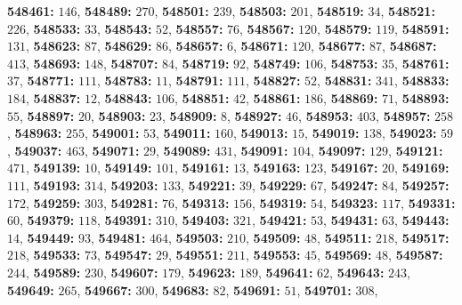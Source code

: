 \textsf{\bfseries 548461:} $146$, \textsf{\bfseries 548489:} $270$, \textsf{\bfseries 548501:} $239$, \textsf{\bfseries 548503:} $201$, \textsf{\bfseries 548519:} $34$, \textsf{\bfseries 548521:} $226$, \textsf{\bfseries 548533:} $33$, \textsf{\bfseries 548543:} $52$, \textsf{\bfseries 548557:} $76$, \textsf{\bfseries 548567:} $120$, \textsf{\bfseries 548579:} $119$, \textsf{\bfseries 548591:} $131$, \textsf{\bfseries 548623:} $87$, \textsf{\bfseries 548629:} $86$, \textsf{\bfseries 548657:} $6$, \textsf{\bfseries 548671:} $120$, \textsf{\bfseries 548677:} $87$, \textsf{\bfseries 548687:} $413$, \textsf{\bfseries 548693:} $148$, \textsf{\bfseries 548707:} $84$, \textsf{\bfseries 548719:} $92$, \textsf{\bfseries 548749:} $106$, \textsf{\bfseries 548753:} $35$, \textsf{\bfseries 548761:} $37$, \textsf{\bfseries 548771:} $111$, \textsf{\bfseries 548783:} $11$, \textsf{\bfseries 548791:} $111$, \textsf{\bfseries 548827:} $52$, \textsf{\bfseries 548831:} $341$, \textsf{\bfseries 548833:} $184$, \textsf{\bfseries 548837:} $12$, \textsf{\bfseries 548843:} $106$, \textsf{\bfseries 548851:} $42$, \textsf{\bfseries 548861:} $186$, \textsf{\bfseries 548869:} $71$, \textsf{\bfseries 548893:} $55$, \textsf{\bfseries 548897:} $20$, \textsf{\bfseries 548903:} $23$, \textsf{\bfseries 548909:} $8$, \textsf{\bfseries 548927:} $46$, \textsf{\bfseries 548953:} $403$, \textsf{\bfseries 548957:} $258$, \textsf{\bfseries 548963:} $255$, \textsf{\bfseries 549001:} $53$, \textsf{\bfseries 549011:} $160$, \textsf{\bfseries 549013:} $15$, \textsf{\bfseries 549019:} $138$, \textsf{\bfseries 549023:} $59$, \textsf{\bfseries 549037:} $463$, \textsf{\bfseries 549071:} $29$, \textsf{\bfseries 549089:} $431$, \textsf{\bfseries 549091:} $104$, \textsf{\bfseries 549097:} $129$, \textsf{\bfseries 549121:} $471$, \textsf{\bfseries 549139:} $10$, \textsf{\bfseries 549149:} $101$, \textsf{\bfseries 549161:} $13$, \textsf{\bfseries 549163:} $123$, \textsf{\bfseries 549167:} $20$, \textsf{\bfseries 549169:} $111$, \textsf{\bfseries 549193:} $314$, \textsf{\bfseries 549203:} $133$, \textsf{\bfseries 549221:} $39$, \textsf{\bfseries 549229:} $67$, \textsf{\bfseries 549247:} $84$, \textsf{\bfseries 549257:} $172$, \textsf{\bfseries 549259:} $303$, \textsf{\bfseries 549281:} $76$, \textsf{\bfseries 549313:} $156$, \textsf{\bfseries 549319:} $54$, \textsf{\bfseries 549323:} $117$, \textsf{\bfseries 549331:} $60$, \textsf{\bfseries 549379:} $118$, \textsf{\bfseries 549391:} $310$, \textsf{\bfseries 549403:} $321$, \textsf{\bfseries 549421:} $53$, \textsf{\bfseries 549431:} $63$, \textsf{\bfseries 549443:} $14$, \textsf{\bfseries 549449:} $93$, \textsf{\bfseries 549481:} $464$, \textsf{\bfseries 549503:} $210$, \textsf{\bfseries 549509:} $48$, \textsf{\bfseries 549511:} $218$, \textsf{\bfseries 549517:} $218$, \textsf{\bfseries 549533:} $73$, \textsf{\bfseries 549547:} $29$, \textsf{\bfseries 549551:} $211$, \textsf{\bfseries 549553:} $45$, \textsf{\bfseries 549569:} $48$, \textsf{\bfseries 549587:} $244$, \textsf{\bfseries 549589:} $230$, \textsf{\bfseries 549607:} $179$, \textsf{\bfseries 549623:} $189$, \textsf{\bfseries 549641:} $62$, \textsf{\bfseries 549643:} $243$, \textsf{\bfseries 549649:} $265$, \textsf{\bfseries 549667:} $300$, \textsf{\bfseries 549683:} $82$, \textsf{\bfseries 549691:} $51$, \textsf{\bfseries 549701:} $308$, 
